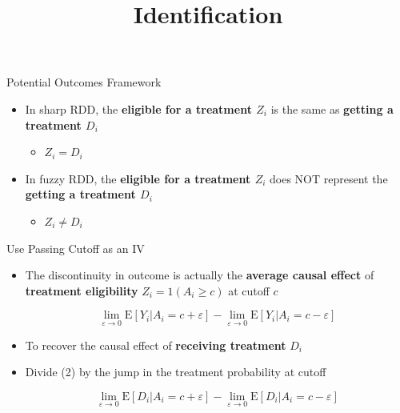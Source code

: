 \documentclass[hyperref={pdfpagelabels=false}]{beamer}
\begin{document}
\begin{frame}{Potential Outcomes Framework}
	\begin{itemize}
		
		\item In sharp RDD, the \textbf{eligible for a treatment $Z_{i}$} is the same as \textbf{getting a treatment $D_{i}$} 
		\vspace{0.2cm}
		\begin{itemize}
			\item $Z_{i}=D_{i}$
		\end{itemize}
		
		\vspace{0.2cm}
		\item In fuzzy RDD, the \textbf{eligible for a treatment $Z_{i}$} does NOT represent the \textbf{getting a treatment $D_{i}$} 
		
		\vspace{0.2cm}
		\begin{itemize}
			\item $Z_{i}\neq D_{i}$
		\end{itemize}
		
		
		
		
		
	\end{itemize}
\end{frame}

\title[]
{Identification}

\author
{}

\institute{}

\date
{}

\begin{frame}{}
	\titlepage
\end{frame}

\begin{frame}{Use Passing Cutoff as an IV}{}
	\begin{itemize}
		
		\item The discontinuity in outcome is actually the \textbf{average causal effect} of \textbf{treatment eligibility} $Z_{i}=1(A_i\geq c)$ at cutoff $c$
		
		\begin{equation}
			\lim_{\varepsilon\rightarrow 0}\mathrm{E}[Y_{i}|A_{i}=c+\varepsilon]-\lim_{\varepsilon\rightarrow 0}\mathrm{E}[Y_{i}|A_{i}=c-\varepsilon]	
		\end{equation}
		
		
		\item To recover the causal effect of \textbf{receiving treatment} $D_{i}$
		\vspace{0.2cm}
		\item Divide (2) by the jump in the treatment probability at cutoff
		
		\begin{equation*}
			\lim_{\varepsilon\rightarrow 0}\mathrm{E}[D_{i}|A_{i}=c+\varepsilon]-\lim_{\varepsilon\rightarrow 0}\mathrm{E}[D_{i}|A_{i}=c-\varepsilon]
		\end{equation*}
		
	\end{itemize}
\end{frame}
\end{document}
